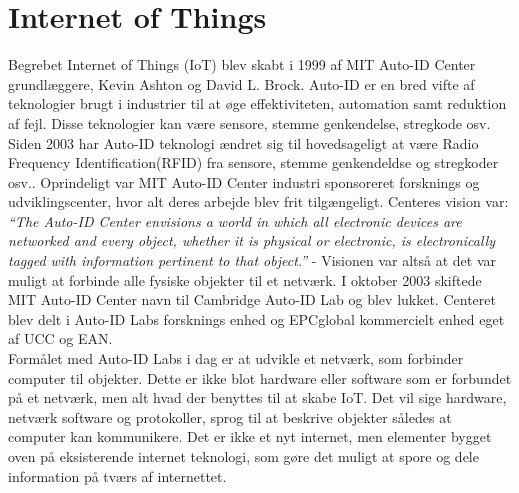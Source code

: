     \section{Internet of Things}
        Begrebet Internet of Things (IoT) blev skabt i 1999 af MIT Auto-ID Center grundlæggere, Kevin Ashton og David L. Brock.\autocite{Hashmi2017} Auto-ID er en bred vifte af teknologier brugt i industrier til at øge effektiviteten, automation samt reduktion af fejl. Disse teknologier kan være sensore, stemme genkendelse, stregkode osv.
        Siden 2003 har Auto-ID teknologi ændret sig til hovedsageligt at være Radio Frequency Identification(RFID) fra sensore, stemme genkendeldse og stregkoder osv.\autocite{Sundmaeker2010}. Oprindeligt var MIT Auto-ID Center industri sponsoreret forsknings og udviklingscenter, hvor alt deres arbejde blev frit tilgængeligt. Centeres vision var:\\
        \textit{``The Auto-ID Center envisions a world in which all electronic devices are networked and every object, whether it is physical or electronic, is electronically tagged with information pertinent to that object.''} -\autocite[Kapitel 2,p. ~4]{Sarma2001} Visionen var altså at det var muligt at forbinde alle fysiske objekter til et netværk. 
        I oktober 2003 skiftede MIT Auto-ID Center navn til Cambridge Auto-ID Lab og blev lukket. Centeret blev delt i Auto-ID Labs forsknings enhed og EPCglobal kommercielt enhed eget af UCC og EAN.\autocite{Sundmaeker2010}\\
        Formålet med Auto-ID Labs i dag er at udvikle et netværk, som forbinder computer til objekter. Dette er ikke blot hardware eller software som er forbundet på et netværk, men alt hvad der benyttes til at skabe IoT. Det vil sige hardware, netværk software og protokoller, sprog til at beskrive objekter således at computer kan kommunikere. Det er ikke et nyt internet, men elementer bygget oven på eksisterende internet teknologi, som gøre det muligt at spore og dele information på tværs af internettet.\autocite{Sundmaeker2010} \\
